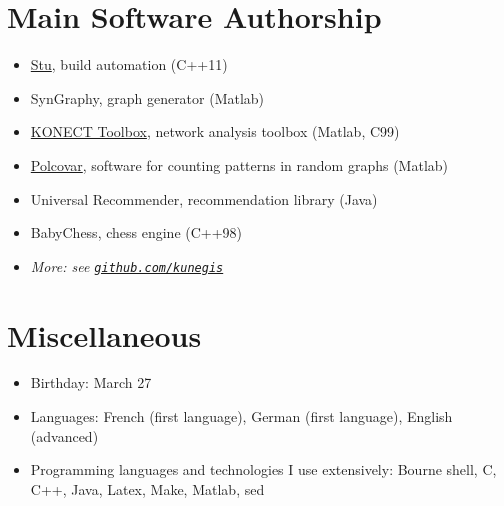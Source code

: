 \documentclass[line,margin]{res}
\begin{document}
\begin{resume}
\section{Main Software Authorship}
\begin{itemize}
  \item \href{https://github.com/kunegis/stu}{Stu}, build automation (C++11)
  \item SynGraphy, graph generator (Matlab)
  \item \href{http://konect.uni-koblenz.de/toolbox}{KONECT Toolbox}, network analysis toolbox (Matlab, C99)
  \item \href{https://west.uni-koblenz.de/Research/systems/polcovar}{Polcovar}, software for counting patterns in random graphs (Matlab)
  \item Universal Recommender, recommendation library (Java)
  \item BabyChess, chess engine (C++98)
  \item \emph{More:  see {\tt \href{https://github.com/kunegis}{github.com/kunegis}}}
\end{itemize}

\section{Miscellaneous}
\begin{itemize}
  \item Birthday:  March 27
  \item Languages: French (first language), German (first language),
    English (advanced)
  \item Programming languages and technologies I use extensively:
    Bourne shell, C, C++, Java, Latex, Make, Matlab, sed
\end{itemize}

\end{resume}
\end{document}
